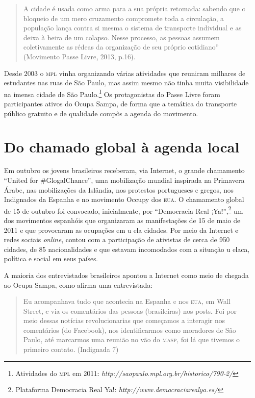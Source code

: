 \begin{quote}
A cidade é usada como arma para a sua própria retomada: sabendo que o
bloqueio de um mero cruzamento compromete toda a circulação, a população
lança contra si mesma o sistema de transporte individual e as deixa à
beira de um colapso. Nesse processo, as pessoas assumem coletivamente as
rédeas da organização de seu próprio cotidiano'' (Movimento Passe Livre,
2013, p.16).
\end{quote}

Desde 2003 o \textsc{mpl} vinha organizando várias atividades que reuniram
milhares de estudantes nas ruas de São Paulo, mas assim mesmo não tinha
muita visibilidade na imensa cidade de São Paulo.\footnote{Atividades do
  \textsc{mpl} em 2011: \emph{http://saopaulo.mpl.org.br/historico/790-2/}} Os
protagonistas do Passe Livre foram participantes ativos do Ocupa
Sampa, de forma que a temática do transporte público gratuito e de
qualidade compôs a agenda do movimento.

\section{Do chamado global à agenda local}

Em outubro os jovens brasileiros receberam, via Internet, o grande
chamamento ``United for \#GlogalChance'', uma mobilização mundial
inspirada na Primavera Árabe, nas mobilizações da Islândia, nos
protestos portugueses e gregos, nos Indignados da Espanha e no movimento
Occupy dos \textsc{eua}. O chamamento global de 15 de outubro foi convocado,
inicialmente, por ``Democracia Real ¡Ya!'',\footnote{Plataforma
  Democracia Real Ya!: \emph{http://www.democraciarealya.es/}} um dos
movimentos espanhóis que organizaram as manifestações de 15 de maio de
2011 e que provocaram as ocupações em u ela cidades. Por meio da
Internet e redes sociais \emph{online}, contou com a participação de ativistas
de cerca de 950 cidades, de 85 nacionalidades e que estavam
incomodados com a situação u elaca, política e social em seus países.

A maioria dos entrevistados brasileiros apontou a Internet como
meio de chegada ao Ocupa Sampa, como afirma uma entrevistada:

\begin{quote}
Eu acompanhava tudo que acontecia na Espanha e nos \textsc{eua}, em Wall Street,
e via os comentários das pessoas (brasileiras) nos posts. Foi por meio
dessas notícias revolucionarias que começamos a interagir nos
comentários (do Facebook), nos identificarmos como moradores de São
Paulo, até marcarmos uma reunião no vão do \textsc{masp}, foi lá que tivemos o
primeiro contato. (Indignada 7)
\end{quote}

